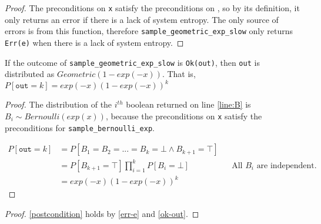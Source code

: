 \documentclass{article}
\begin{document}
\begin{proof}
    The preconditions on \texttt{x} satisfy the preconditions on ,
    so by its definition, it only returns an error if there is a lack of system entropy.
    The only source of errors is from this function,
    therefore \texttt{sample\_geometric\_exp\_slow} only returns \texttt{Err(e)} when there is a lack of system entropy.
\end{proof}

\begin{theorem} \label{ok-out} \cite{CKS20}
    If the outcome of \texttt{sample\_geometric\_exp\_slow} is \texttt{Ok(out)},
    then \texttt{out} is distributed as $Geometric(1 - exp(-x))$. That is, $P[\texttt{out} = k] = exp(-x) (1 - exp(-x))^{k}$
\end{theorem}

\begin{proof}
    The distribution of the $i^{th}$ boolean returned on line \ref{line:B} is $B_i \sim Bernoulli(exp(x))$,
    because the preconditions on \texttt{x} satisfy the preconditions for \texttt{sample\_bernoulli\_exp}.

    \begin{align*}
        P[\texttt{out} = k] &= P[B_1 = B_2 = ... = B_k = \bot \land B_{k + 1} = \top] \\
        &= P[B_{k + 1} = \top] \prod_{i=1}^{k} P[B_i = \bot] && \text{All $B_i$ are independent.} \\
        &= exp(-x) (1 - exp(-x))^{k}
    \end{align*}
\end{proof}

\begin{proof}
    \ref{postcondition} holds by \ref{err-e} and \ref{ok-out}.
\end{proof}




\end{document}
